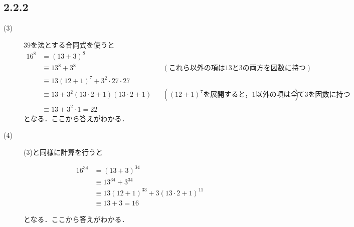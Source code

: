 \documentclass[uplatex,dvipdfmx,a4paper,11pt]{jsarticle}
\newenvironment{tleftbar}{\begin{tbleftline}\setlength{\parindent}{1zw}}{\end{tbleftline}}
\begin{document}
\subsection*{2.2.2}
\begin{tleftbar}
    \begin{description}
        \item[(3)]$39$を法とする合同式を使うと 
        \begin{align*}
            16^8&=(13+3)^8\\
            &\equiv 13^8+3^8 &&(\text{これら以外の項は$13$と$3$の両方を因数に持つ})\\
            &\equiv 13(12+1)^7+3^2\cdot 27\cdot 27\\
            &\equiv 13 +3^2(13\cdot 2 +1)(13\cdot 2 +1) &&((12+1)^7\text{を展開すると，$1$以外の項は全て$3$を因数に持つ})\\
            &\equiv 13+3^2\cdot 1 =22
        \end{align*} 
        となる．ここから答えがわかる．
        \item[(4)] (3)と同様に計算を行うと
        \begin{fleqn}[30pt]
            \begin{align*}
                16^{34}&=(13+3)^{34}\\
                &\equiv 13^{34}+3^{34} \\
                &\equiv 13(12+1)^{33}+3(13\cdot 2+1)^{11}\\
                &\equiv 13+3=16
            \end{align*}  
        \end{fleqn} 
        となる．ここから答えがわかる．
    \end{description}
\end{tleftbar}
\end{document}
